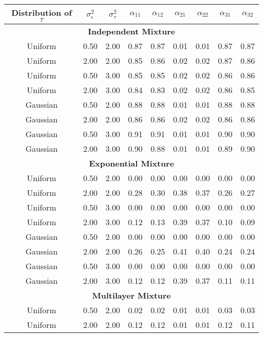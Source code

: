 \documentclass[12pt]{article}
\begin{document}
\begin{table}[ht]
\begin{center}
\begin{tabular}{cc|ccccccc}
  \hline Distribution of $\tau$&$\sigma_{\epsilon}^2$&$\sigma_{\tau}^2$&$\alpha_{11}$&$\alpha_{12}$&$\alpha_{21}$&$\alpha_{22}$&$\alpha_{31}$&$\alpha_{32}$\\ \hline\multicolumn{9}{c}{\textbf{Independent Mixture}}\\ Uniform & 0.50 & 2.00 & 0.87 & 0.87 & 0.01 & 0.01 & 0.87 & 0.87 \\ 
  Uniform & 2.00 & 2.00 & 0.85 & 0.86 & 0.02 & 0.02 & 0.87 & 0.86 \\ 
  Uniform & 0.50 & 3.00 & 0.85 & 0.85 & 0.02 & 0.02 & 0.86 & 0.86 \\ 
  Uniform & 2.00 & 3.00 & 0.84 & 0.83 & 0.02 & 0.02 & 0.86 & 0.85 \\ 
  Gaussian & 0.50 & 2.00 & 0.88 & 0.88 & 0.01 & 0.01 & 0.88 & 0.88 \\ 
  Gaussian & 2.00 & 2.00 & 0.86 & 0.86 & 0.02 & 0.02 & 0.86 & 0.86 \\ 
  Gaussian & 0.50 & 3.00 & 0.91 & 0.91 & 0.01 & 0.01 & 0.90 & 0.90 \\ 
  Gaussian & 2.00 & 3.00 & 0.90 & 0.88 & 0.01 & 0.01 & 0.89 & 0.90 \\ 
   \multicolumn{9}{c}{\textbf{Exponential Mixture}}\\Uniform & 0.50 & 2.00 & 0.00 & 0.00 & 0.00 & 0.00 & 0.00 & 0.00 \\ 
  Uniform & 2.00 & 2.00 & 0.28 & 0.30 & 0.38 & 0.37 & 0.26 & 0.27 \\ 
  Uniform & 0.50 & 3.00 & 0.00 & 0.00 & 0.00 & 0.00 & 0.00 & 0.00 \\ 
  Uniform & 2.00 & 3.00 & 0.12 & 0.13 & 0.39 & 0.37 & 0.10 & 0.09 \\ 
  Gaussian & 0.50 & 2.00 & 0.00 & 0.00 & 0.00 & 0.00 & 0.00 & 0.00 \\ 
  Gaussian & 2.00 & 2.00 & 0.26 & 0.25 & 0.41 & 0.40 & 0.24 & 0.24 \\ 
  Gaussian & 0.50 & 3.00 & 0.00 & 0.00 & 0.00 & 0.00 & 0.00 & 0.00 \\ 
  Gaussian & 2.00 & 3.00 & 0.12 & 0.12 & 0.39 & 0.37 & 0.11 & 0.11 \\ 
   \multicolumn{9}{c}{\textbf{Multilayer Mixture}}\\Uniform & 0.50 & 2.00 & 0.02 & 0.02 & 0.01 & 0.01 & 0.03 & 0.03 \\ 
  Uniform & 2.00 & 2.00 & 0.12 & 0.12 & 0.01 & 0.01 & 0.12 & 0.11 \\ 

\end{tabular}
\end{center}
\end{table}
\end{document}
